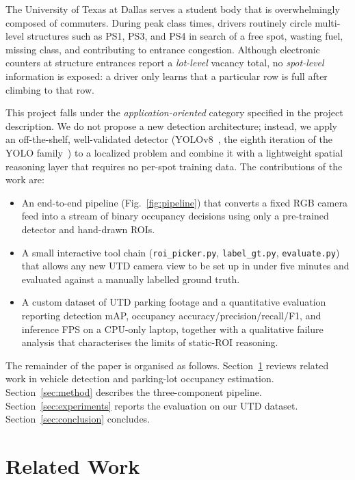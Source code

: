 \documentclass[10pt,twocolumn,letterpaper]{article}
\begin{document}
The University of Texas at Dallas serves a student body that is
overwhelmingly composed of commuters. During peak class times, drivers
routinely circle multi-level structures such as PS1, PS3, and PS4 in search
of a free spot, wasting fuel, missing class, and contributing to entrance
congestion. Although electronic counters at structure entrances report a
\emph{lot-level} vacancy total, no \emph{spot-level} information is exposed:
a driver only learns that a particular row is full after climbing to that
row.

This project falls under the \emph{application-oriented} category specified
in the project description. We do not propose a new detection architecture;
instead, we apply an off-the-shelf, well-validated detector
(YOLOv8~\cite{jocher2023yolov8}, the eighth iteration of the YOLO
family~\cite{redmon2016yolo}) to a localized problem and combine it with a
lightweight spatial reasoning layer that requires no per-spot training data.
The contributions of the work are:

\begin{itemize}
    \itemsep0em
    \item An end-to-end pipeline (Fig.~\ref{fig:pipeline}) that converts a
          fixed RGB camera feed into a stream of binary occupancy decisions
          using only a pre-trained detector and hand-drawn ROIs.
    \item A small interactive tool chain (\texttt{roi\_picker.py},
          \texttt{label\_gt.py}, \texttt{evaluate.py}) that allows any new
          UTD camera view to be set up in under five minutes and evaluated
          against a manually labelled ground truth.
    \item A custom dataset of UTD parking footage and a quantitative
          evaluation reporting detection mAP, occupancy
          accuracy/precision/recall/F1, and inference FPS on a CPU-only
          laptop, together with a qualitative failure analysis that
          characterises the limits of static-ROI reasoning.
\end{itemize}

The remainder of the paper is organised as follows.
Section~\ref{sec:related} reviews related work in vehicle detection and
parking-lot occupancy estimation. Section~\ref{sec:method} describes the
three-component pipeline. Section~\ref{sec:experiments} reports the
evaluation on our UTD dataset. Section~\ref{sec:conclusion} concludes.

\section{Related Work}
\label{sec:related}
\end{document}
